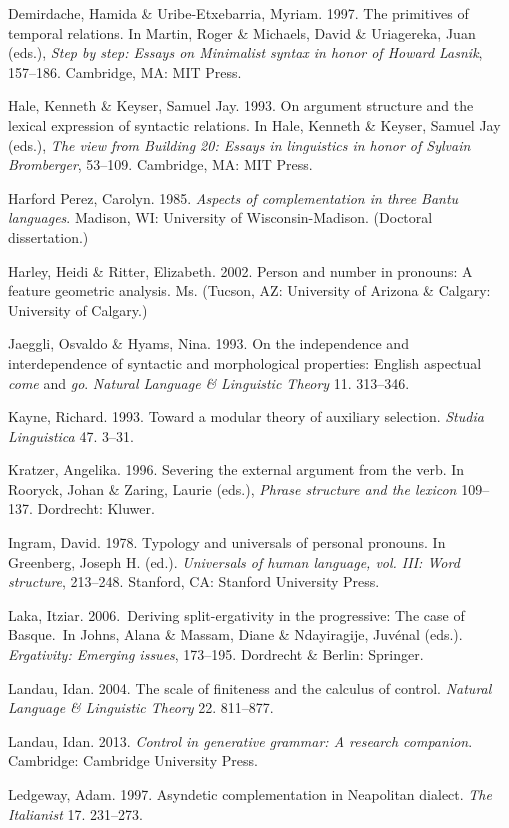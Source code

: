 \documentclass[output=paper]{langsci/langscibook}
\begin{document}
Demirdache, Hamida \& Uribe-Etxebarria, Myriam. 1997. The primitives of temporal relations. In Martin, Roger \& Michaels, David \& Uriagereka, Juan (eds.), \textit{Step by step: Essays on Minimalist syntax in honor of Howard Lasnik}, 157–186. Cambridge, MA: MIT Press.

Hale, Kenneth \& Keyser, Samuel Jay. 1993. On argument structure and the lexical expression of syntactic relations. In Hale, Kenneth \& Keyser, Samuel Jay (eds.), \textit{The view from Building 20: Essays in linguistics in honor of Sylvain Bromberger}, 53–109. Cambridge, MA: MIT Press. 

Harford Perez, Carolyn. 1985. \textit{Aspects of complementation in three Bantu languages}. Madison, WI: University of Wisconsin-Madison. (Doctoral dissertation.)

Harley, Heidi \& Ritter, Elizabeth. 2002. Person and number in pronouns: A feature geometric analysis. Ms. (Tucson, AZ: University of Arizona \& Calgary: University of Calgary.)

Jaeggli, Osvaldo \& Hyams, Nina. 1993. On the independence and interdependence of syntactic and morphological properties: English aspectual \textit{come} and \textit{go}. \textit{Natural Language \&}  \textit{Linguistic Theory} 11. 313–346.

Kayne, Richard. 1993. Toward a modular theory of auxiliary selection. \textit{Studia Linguistica} 47. 3–31.

Kratzer, Angelika. 1996. Severing the external argument from the verb. In Rooryck, Johan \& Zaring, Laurie (eds.), \textit{Phrase structure and the lexicon} 109–137. Dordrecht: Kluwer. 

Ingram, David. 1978. Typology and universals of personal pronouns. In Greenberg, Joseph H. (ed.). \textit{Universals of human language, vol. III: Word structure}, 213–248. Stanford, CA: Stanford University Press.

Laka, Itziar. 2006.~Deriving split-ergativity in the progressive: The case of Basque.~In Johns, Alana \& Massam, Diane \& Ndayiragije, Juvénal (eds.). \textit{Ergativity: Emerging issues}, 173–195. Dordrecht \& Berlin: Springer.

Landau, Idan. 2004. The scale of finiteness and the calculus of control. \textit{Natural Language \&}  \textit{Linguistic Theory} 22. 811–877.

Landau, Idan. 2013. \textit{Control in generative grammar: A research companion}. Cambridge: Cambridge University Press.

Ledgeway, Adam. 1997. Asyndetic complementation in Neapolitan dialect. \textit{The Italianist} 17. 231–273.
\end{document}
